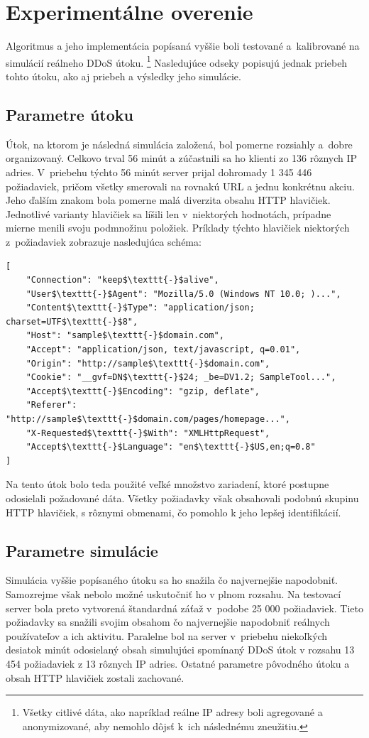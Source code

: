 \documentclass[
  digital, %
  oneside, %
  table,   %
  lof,     %
  nolot,   %
  nocover
]{fithesis3}
\begin{document}
\chapter{Experimentálne overenie}
\label{ch:data}
Algoritmus a jeho implementácia popísaná vyššie boli testované a~kalibrované na
simulácií reálneho DDoS útoku. \footnote{Všetky citlivé dáta, ako napríklad reálne IP
adresy boli agregované a anonymizované, aby nemohlo dôjsť k~ich následnému
zneužitiu.} Nasledujúce odseky popisujú jednak priebeh tohto
útoku, ako aj priebeh a výsledky jeho simulácie. 

\section{Parametre útoku}
Útok, na ktorom je následná simulácia založená, bol pomerne rozsiahly a~dobre
organizovaný. Celkovo trval 56 minút a zúčastnili sa ho klienti zo 136 rôznych
IP adries. V~priebehu týchto 56 minút server prijal dohromady 1 345 446 požiadaviek, pričom
všetky smerovali na rovnakú URL a jednu konkrétnu akciu. Jeho ďalším znakom bola
pomerne malá diverzita obsahu HTTP hlavičiek. Jednotlivé varianty hlavičiek sa líšili
len v~niektorých hodnotách, prípadne mierne menili svoju podmnožinu položiek. Príklady týchto hlavičiek
niektorých z~požiadaviek zobrazuje nasledujúca schéma: 

\begin{lstlisting}[basicstyle=\footnotesize, mathescape=true]
[
    "Connection": "keep$\texttt{-}$alive",
    "User$\texttt{-}$Agent": "Mozilla/5.0 (Windows NT 10.0; )...",
    "Content$\texttt{-}$Type": "application/json; charset=UTF$\texttt{-}$8",
    "Host": "sample$\texttt{-}$domain.com",
    "Accept": "application/json, text/javascript, q=0.01",
    "Origin": "http://sample$\texttt{-}$domain.com",
    "Cookie": "__gvf=DN$\texttt{-}$24; _be=DV1.2; SampleTool...",
    "Accept$\texttt{-}$Encoding": "gzip, deflate",
    "Referer": "http://sample$\texttt{-}$domain.com/pages/homepage...",
    "X-Requested$\texttt{-}$With": "XMLHttpRequest",
    "Accept$\texttt{-}$Language": "en$\texttt{-}$US,en;q=0.8"
]
\end{lstlisting}

Na tento útok bolo teda použité veľké množstvo zariadení, ktoré postupne
odosielali požadované dáta. Všetky požiadavky však obsahovali podobnú skupinu
HTTP hlavičiek, s rôznymi obmenami, čo pomohlo k jeho lepšej identifikácií.

\section{Parametre simulácie}
Simulácia vyššie popísaného útoku sa ho snažila čo najvernejšie napodobniť.
Samozrejme však nebolo možné uskutočniť ho v plnom rozsahu. Na testovací server
bola preto vytvorená štandardná záťaž v~podobe 25 000 požiadaviek. Tieto požiadavky
sa snažili svojim obsahom čo najvernejšie napodobniť reálnych používateľov a
ich aktivitu. Paralelne bol na server  v~priebehu niekoľkých desiatok minút
odosielaný obsah simulujúci spomínaný DDoS útok v rozsahu 13 454 požiadaviek z
13 rôznych IP adries. Ostatné parametre pôvodného útoku a obsah HTTP hlavičiek
zostali zachované.
\end{document}
